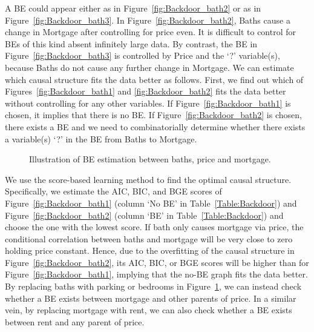 \documentclass[11pt,review,authoryear]{elsarticle}
\begin{document}
A BE could appear either as in Figure~\ref{fig:Backdoor_bath2} or as in Figure~\ref{fig:Backdoor_bath3}. In Figure~\ref{fig:Backdoor_bath2}, Baths cause a change in Mortgage after controlling for price even. It is difficult to control for BEs of this kind absent infinitely large data. By contrast, the BE in Figure~\ref{fig:Backdoor_bath3} is controlled by Price and the `?' variable(s), because Baths do not cause any further change in Mortgage. We can estimate which causal structure fits the data better as follows. First, we find out which of Figures~\ref{fig:Backdoor_bath1} and \ref{fig:Backdoor_bath2} fits the data better without controlling for any other variables. If Figure~\ref{fig:Backdoor_bath1} is chosen, it implies that there is no BE. If Figure~\ref{fig:Backdoor_bath2} is chosen, there exists a BE and we need to combinatorially determine whether there exists a variable(s) `?' in the BE from Baths to Mortgage.

\begin{figure}[H]
  \centering
  \hfil
  \hfil
  \caption{Illustration of BE estimation between baths, price and mortgage.}
  \label{fig:Backdoor_bath}
\end{figure}

We use the score-based learning method to find the optimal causal structure. Specifically, we estimate the AIC, BIC, and BGE scores of Figure~\ref{fig:Backdoor_bath1} (column `No BE' in Table~\ref{Table:Backdoor}) and Figure~\ref{fig:Backdoor_bath2} (column `BE' in Table~\ref{Table:Backdoor}) and choose the one with the lowest score. If bath only causes mortgage via price, the conditional correlation between baths and mortgage will be very close to zero holding price constant. Hence, due to the overfitting of the causal structure in Figure~\ref{fig:Backdoor_bath2}, its AIC, BIC, or BGE scores will be higher than for Figure~\ref{fig:Backdoor_bath1}, implying that the no-BE graph fits the data better. By replacing baths with parking or bedrooms in Figure~\ref{fig:Backdoor_bath}, we can instead check whether a BE exists between mortgage and other parents of price. In a similar vein, by replacing mortgage with rent, we can also check whether a BE exists between rent and any parent of price.
\end{document}
